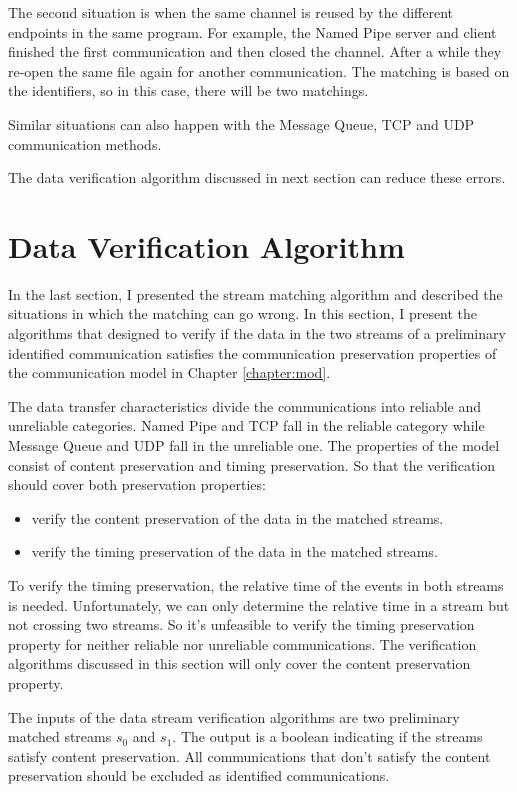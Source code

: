 The second situation is when the same channel is reused by the different endpoints in the same program. For example, the Named Pipe server and client finished the first communication and then closed the channel. After a while they re-open the same file again for another communication. The matching is based on the identifiers, so in this case, there will be two matchings.

Similar situations can also happen with the Message Queue, TCP and UDP communication methods. 

The data verification algorithm discussed in next section can reduce these errors. 

\section{Data Verification Algorithm}\label{verfication}
In the last section, I presented the stream matching algorithm and described the situations in which the matching can go wrong. In this section, I present the algorithms that designed to verify if the data in the two streams of a preliminary identified communication satisfies the communication preservation properties of the communication model in Chapter \ref{chapter:mod}. 

The data transfer characteristics divide the communications into reliable and unreliable categories. Named Pipe and TCP fall in the reliable category while Message Queue and UDP fall in the unreliable one. The properties of the model consist of content preservation and timing preservation. So that the verification should cover both preservation properties: 
\begin{itemize}
\item verify the content preservation of the data in the matched streams. 
\item verify the timing preservation of the data in the matched streams. 
\end{itemize}

To verify the timing preservation, the relative time of the events in both streams is needed. Unfortunately, we can only determine the relative time in a stream but not crossing two streams. So it's unfeasible to verify the timing preservation property for neither reliable nor unreliable communications. The verification algorithms discussed in this section will only cover the content preservation property.  

The inputs of the data stream verification algorithms are two preliminary matched streams $s_0$ and $s_1$. The output is a boolean indicating if the streams satisfy content preservation. All communications that don't satisfy the content preservation should be excluded as identified communications.

